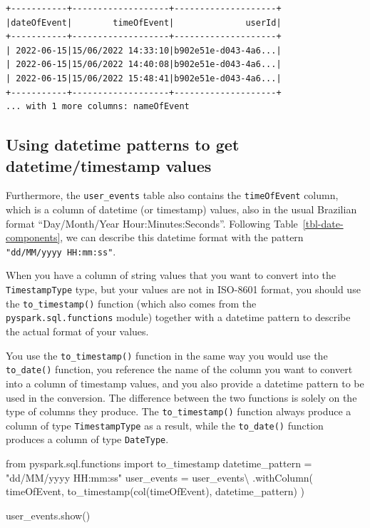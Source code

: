 \documentclass[
  11pt,
  letterpaper,
  DIV=11,
  numbers=noendperiod]{scrreprt}
\newenvironment{Shaded}{\begin{snugshade}}{\end{snugshade}}
\newcommand{\ImportTok}[1]{\textcolor[rgb]{0.00,0.46,0.62}{#1}}
\newcommand{\NormalTok}[1]{\textcolor[rgb]{0.00,0.23,0.31}{#1}}
\newcommand{\OperatorTok}[1]{\textcolor[rgb]{0.37,0.37,0.37}{#1}}
\newcommand{\StringTok}[1]{\textcolor[rgb]{0.13,0.47,0.30}{#1}}
\begin{document}
\begin{verbatim}
+-----------+-------------------+--------------------+
|dateOfEvent|        timeOfEvent|              userId|
+-----------+-------------------+--------------------+
| 2022-06-15|15/06/2022 14:33:10|b902e51e-d043-4a6...|
| 2022-06-15|15/06/2022 14:40:08|b902e51e-d043-4a6...|
| 2022-06-15|15/06/2022 15:48:41|b902e51e-d043-4a6...|
+-----------+-------------------+--------------------+
... with 1 more columns: nameOfEvent
\end{verbatim}

\subsection{Using datetime patterns to get datetime/timestamp
values}\label{using-datetime-patterns-to-get-datetimetimestamp-values}

Furthermore, the \texttt{user\_events} table also contains the
\texttt{timeOfEvent} column, which is a column of datetime (or
timestamp) values, also in the usual Brazilian format ``Day/Month/Year
Hour:Minutes:Seconds''. Following Table~\ref{tbl-date-components}, we
can describe this datetime format with the pattern
\texttt{"dd/MM/yyyy\ HH:mm:ss"}.

When you have a column of string values that you want to convert into
the \texttt{TimestampType} type, but your values are not in ISO-8601
format, you should use the \texttt{to\_timestamp()} function (which also
comes from the \texttt{pyspark.sql.functions} module) together with a
datetime pattern to describe the actual format of your values.

You use the \texttt{to\_timestamp()} function in the same way you would
use the \texttt{to\_date()} function, you reference the name of the
column you want to convert into a column of timestamp values, and you
also provide a datetime pattern to be used in the conversion. The
difference between the two functions is solely on the type of columns
they produce. The \texttt{to\_timestamp()} function always produce a
column of type \texttt{TimestampType} as a result, while the
\texttt{to\_date()} function produces a column of type
\texttt{DateType}.

\begin{Shaded}
\begin{Highlighting}[]
\ImportTok{from}\NormalTok{ pyspark.sql.functions }\ImportTok{import}\NormalTok{ to\_timestamp}
\NormalTok{datetime\_pattern }\OperatorTok{=} \StringTok{"dd/MM/yyyy HH:mm:ss"}
\NormalTok{user\_events }\OperatorTok{=}\NormalTok{ user\_events}\OperatorTok{\textbackslash{}}
\NormalTok{    .withColumn(}
        \StringTok{\textquotesingle{}timeOfEvent\textquotesingle{}}\NormalTok{,}
\NormalTok{        to\_timestamp(col(}\StringTok{\textquotesingle{}timeOfEvent\textquotesingle{}}\NormalTok{), datetime\_pattern)}
\NormalTok{    )}

\NormalTok{user\_events.show()}
\end{Highlighting}
\end{Shaded}
\end{document}
